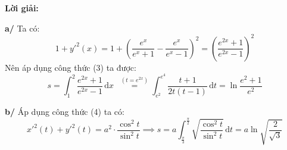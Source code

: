 \noindent\textbf{Lời giải:}

\noindent\textbf{a/} Ta có:
\[
1 + y'^2(x) = 1 + \left( \frac{e^x}{e^x + 1} - \frac{e^x}{e^x - 1} \right)^2 = \left( \frac{e^{2x} + 1}{e^{2x} - 1} \right)^2
\]
Nên áp dụng công thức (3) ta được:
\[
s = \int_{1}^{2} \frac{e^{2x} + 1}{e^{2x} - 1} \, \mathrm{d}x \;\; \stackrel{(t = e^{2x})}{=} \int_{e^2}^{e^4} \frac{t + 1}{2t(t - 1)} \, \mathrm{d}t = \ln \frac{e^2 + 1}{e^2}
\]

\bigskip

\noindent\textbf{b/} Áp dụng công thức (4) ta có:
\[
x'^2(t) + y'^2(t) = a^2 \cdot \frac{\cos^2 t}{\sin^2 t} \implies s = a \int_{\frac{\pi}{3}}^{\frac{\pi}{2}} \sqrt{\frac{\cos^2 t}{\sin^2 t}} \, \mathrm{d}t = a \ln \sqrt{\frac{2}{\sqrt{3}}}
\]
